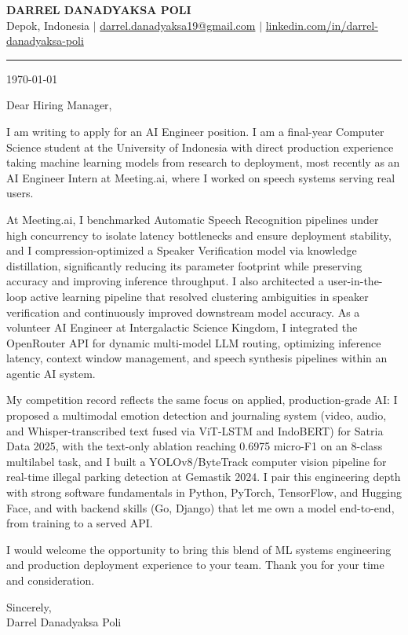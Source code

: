 \documentclass[letterpaper,11pt]{article}
\begin{document}
\begin{center}
    {\LARGE \bfseries DARREL DANADYAKSA POLI} \\[3pt]
    \small Depok, Indonesia \quad $|$ \quad
    \href{mailto:darrel.danadyaksa19@gmail.com}{darrel.danadyaksa19@gmail.com} \quad $|$ \quad
    \href{https://www.linkedin.com/in/darrel-danadyaksa-poli/}{linkedin.com/in/darrel-danadyaksa-poli}
\end{center}
\vspace{2pt}
\hrule
\vspace{14pt}

\today

\vspace{8pt}

Dear Hiring Manager,

I am writing to apply for an AI Engineer position. I am a final-year Computer Science student at the University of Indonesia with direct production experience taking machine learning models from research to deployment, most recently as an AI Engineer Intern at Meeting.ai, where I worked on speech systems serving real users.

At Meeting.ai, I benchmarked Automatic Speech Recognition pipelines under high concurrency to isolate latency bottlenecks and ensure deployment stability, and I compression-optimized a Speaker Verification model via knowledge distillation, significantly reducing its parameter footprint while preserving accuracy and improving inference throughput. I also architected a user-in-the-loop active learning pipeline that resolved clustering ambiguities in speaker verification and continuously improved downstream model accuracy. As a volunteer AI Engineer at Intergalactic Science Kingdom, I integrated the OpenRouter API for dynamic multi-model LLM routing, optimizing inference latency, context window management, and speech synthesis pipelines within an agentic AI system.

My competition record reflects the same focus on applied, production-grade AI: I proposed a multimodal emotion detection and journaling system (video, audio, and Whisper-transcribed text fused via ViT-LSTM and IndoBERT) for Satria Data 2025, with the text-only ablation reaching 0.6975 micro-F1 on an 8-class multilabel task, and I built a YOLOv8/ByteTrack computer vision pipeline for real-time illegal parking detection at Gemastik 2024. I pair this engineering depth with strong software fundamentals in Python, PyTorch, TensorFlow, and Hugging Face, and with backend skills (Go, Django) that let me own a model end-to-end, from training to a served API.

I would welcome the opportunity to bring this blend of ML systems engineering and production deployment experience to your team. Thank you for your time and consideration.

\vspace{10pt}

Sincerely, \\
Darrel Danadyaksa Poli
\end{document}
